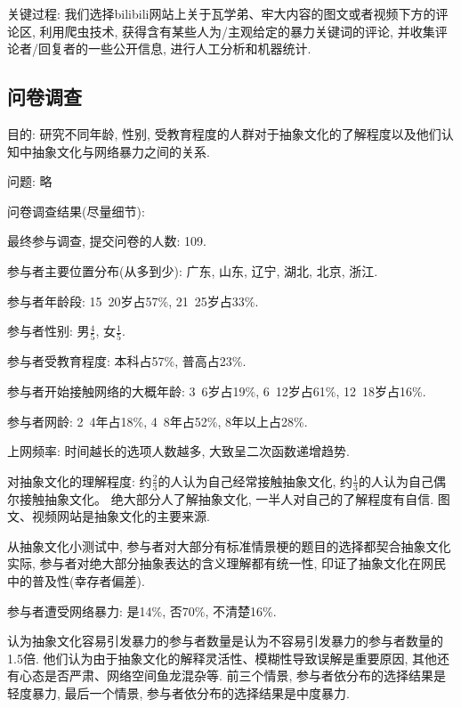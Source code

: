 \documentclass[12pt,a4paper]{ctexart}
\begin{document}
关键过程: 我们选择bilibili网站上关于瓦学弟、牢大内容的图文或者视频下方的评论区, 利用爬虫技术, 获得含有某些人为/主观给定的暴力关键词的评论, 并收集评论者/回复者的一些公开信息, 进行人工分析和机器统计.

\subsection{问卷调查}

目的: 研究不同年龄, 性别, 受教育程度的人群对于抽象文化的了解程度以及他们认知中抽象文化与网络暴力之间的关系.

问题: 略

问卷调查结果(尽量细节):

最终参与调查, 提交问卷的人数: 109.

参与者主要位置分布(从多到少): 广东, 山东, 辽宁, 湖北, 北京, 浙江.

参与者年龄段: 15~20岁占57\%, 21~25岁占33\%.

参与者性别: 男$\frac{4}{5}$, 女$\frac{1}{5}$.

参与者受教育程度: 本科占57\%, 普高占23\%.

参与者开始接触网络的大概年龄: 3~6岁占19\%, 6~12岁占61\%, 12~18岁占16\%.

参与者网龄: 2~4年占18\%, 4~8年占52\%, 8年以上占28\%.

上网频率: 时间越长的选项人数越多, 大致呈二次函数递增趋势.

对抽象文化的理解程度: 约$\frac{2}{3}$的人认为自己经常接触抽象文化, 约$\frac{1}{3}$的人认为自己偶尔接触抽象文化。
绝大部分人了解抽象文化, 一半人对自己的了解程度有自信.
图文、视频网站是抽象文化的主要来源.

从抽象文化小测试中, 参与者对大部分有标准情景梗的题目的选择都契合抽象文化实际, 参与者对绝大部分抽象表达的含义理解都有统一性, 印证了抽象文化在网民中的普及性(幸存者偏差).

参与者遭受网络暴力: 是14\%, 否70\%, 不清楚16\%.

认为抽象文化容易引发暴力的参与者数量是认为不容易引发暴力的参与者数量的1.5倍.
他们认为由于抽象文化的解释灵活性、模糊性导致误解是重要原因, 其他还有心态是否严肃、网络空间鱼龙混杂等.
前三个情景, 参与者依分布的选择结果是轻度暴力, 最后一个情景, 参与者依分布的选择结果是中度暴力.
\end{document}
